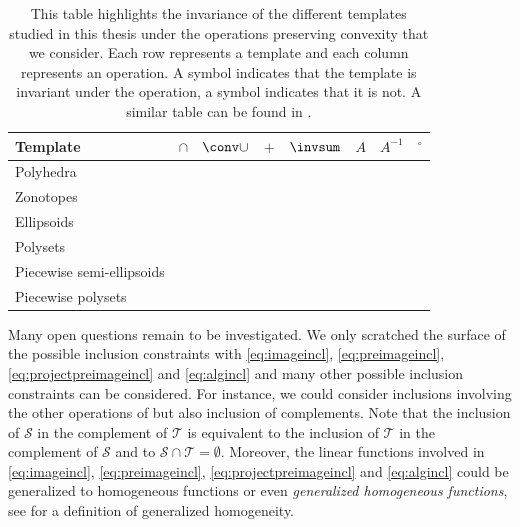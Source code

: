 \documentclass[11pt,twoside,a4paper,openright]{uclouvain-thesis}
\newcommand{\cmark}{\ding{51}}%
\newcommand{\xmark}{\ding{55}}%
\newcommand{\clearemptydoublepage}{%
	\newpage{\pagestyle{empty}\cleardoublepage}}
\begin{document}
\begin{table}[!ht]
  \centering
  \begin{tabular}{l|ccccccc}
    \textbf{Template}          & $\cap$ & $\conv \cup$ &  $+$   & $\invsum$ &  $A$   & $A^{-1}$  & $^\circ$\\
    \hline
    Polyhedra                  & \cmark & \cmark       & \cmark & \cmark    & \cmark & \cmark & \cmark\\
    Zonotopes                  & \xmark & \xmark       & \cmark & \xmark    & \cmark & \xmark & \xmark\\ %
    Ellipsoids                 & \xmark & \xmark       & \xmark & \xmark    & \cmark & \cmark & \cmark\\
    Polysets                   & \xmark & \xmark       & \xmark & \xmark    & \xmark & \cmark & \xmark\\ %
    Piecewise semi-ellipsoids  & \xmark & \xmark       & \xmark & \xmark    & \cmark & \cmark & \cmark\\
    Piecewise polysets         & \xmark & \xmark       & \xmark & \xmark    & \xmark & \cmark & \xmark\\ %
  \end{tabular}
  \caption{
  This table highlights the invariance of the different templates studied in this thesis
  under the operations preserving convexity that we consider.
  Each row represents a template and each column represents an operation.
  A \cmark{} symbol indicates that the template is invariant under the operation,
  a \xmark{} symbol indicates that it is not.
  A similar table can be found in \cite[Table~1]{kochdumper2020constrained}.}
  \label{tab:setop}
\end{table}

Many open questions remain to be investigated.
We only scratched the surface of the possible inclusion constraints with \eqref{eq:imageincl}, \eqref{eq:preimageincl}, \eqref{eq:projectpreimageincl} and \eqref{eq:algincl}
and many other possible inclusion constraints can be considered.
For instance, we could consider inclusions involving the other operations of
 but also
inclusion of complements.
Note that the inclusion of $\mathcal{S}$ in the complement
of $\mathcal{T}$ is equivalent to the inclusion of $\mathcal{T}$ in the complement
of $\mathcal{S}$ and to $\mathcal{S} \cap \mathcal{T} = \emptyset$.
Moreover, the linear functions involved in \eqref{eq:imageincl}, \eqref{eq:preimageincl}, \eqref{eq:projectpreimageincl} and \eqref{eq:algincl} could be generalized to homogeneous functions or even \emph{generalized homogeneous functions}, see \cite{polyakov2020generalized} for a definition of generalized homogeneity.



\clearemptydoublepage

\printbibliography %
\end{document}
